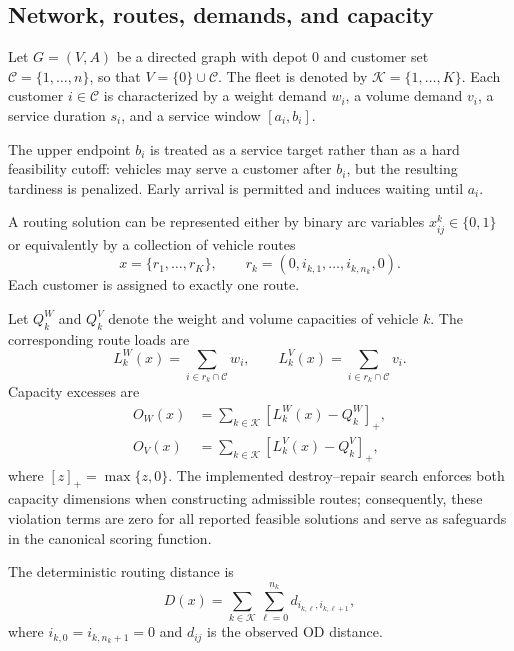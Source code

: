 \documentclass[preprint,12pt]{elsarticle}
\newcommand{\1}{\mathbf{1}}
\begin{document}
\subsection{Network, routes, demands, and capacity}

Let $G=(V,A)$ be a directed graph with depot $0$ and customer set
$\mathcal{C}=\{1,\ldots,n\}$, so that $V=\{0\}\cup\mathcal{C}$.
The fleet is denoted by $\mathcal{K}=\{1,\ldots,K\}$.
Each customer $i\in\mathcal{C}$ is characterized by a weight demand $w_i$,
a volume demand $v_i$, a service duration $s_i$, and a service window
$[a_i,b_i]$.

The upper endpoint $b_i$ is treated as a service target rather than as a hard
feasibility cutoff: vehicles may serve a customer after $b_i$, but the resulting
tardiness is penalized. Early arrival is permitted and induces waiting until
$a_i$.

A routing solution can be represented either by binary arc variables
$x_{ij}^k\in\{0,1\}$ or equivalently by a collection of vehicle routes
\[
x=\{r_1,\ldots,r_K\},
\qquad
r_k=(0,i_{k,1},\ldots,i_{k,n_k},0).
\]
Each customer is assigned to exactly one route.

Let $Q^W_k$ and $Q^V_k$ denote the weight and volume capacities of vehicle $k$.
The corresponding route loads are
\[
L^W_k(x)=\sum_{i\in r_k\cap\mathcal{C}} w_i,
\qquad
L^V_k(x)=\sum_{i\in r_k\cap\mathcal{C}} v_i.
\]
Capacity excesses are
\begin{align}
	O_W(x)
	&=
	\sum_{k\in\mathcal{K}}
	\left[L^W_k(x)-Q^W_k\right]_+,
	\\
	O_V(x)
	&=
	\sum_{k\in\mathcal{K}}
	\left[L^V_k(x)-Q^V_k\right]_+,
\end{align}
where $[z]_+=\max\{z,0\}$.
The implemented destroy--repair search enforces both capacity dimensions when
constructing admissible routes; consequently, these violation terms are zero for
all reported feasible solutions and serve as safeguards in the canonical scoring
function.

The deterministic routing distance is
\begin{equation}
	D(x)
	=
	\sum_{k\in\mathcal{K}}
	\sum_{\ell=0}^{n_k}
	d_{i_{k,\ell},i_{k,\ell+1}},
	\label{eq:distance}
\end{equation}
where $i_{k,0}=i_{k,n_k+1}=0$ and $d_{ij}$ is the observed OD distance.

\end{document}
